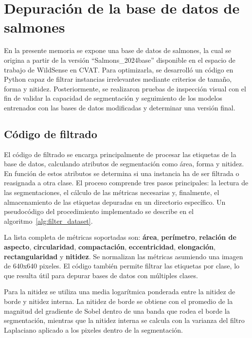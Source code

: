 \section{Depuración de la base de datos de salmones}
En la presente memoria se expone una base de datos de salmones, la cual se origina a partir de la versión ``Salmons\_2024base'' disponible en el espacio de trabajo de WildSense en CVAT. Para optimizarla, se desarrolló un código en Python capaz de filtrar instancias irrelevantes mediante criterios de tamaño, forma y nitidez. Posteriormente, se realizaron pruebas de inspección visual con el fin de validar la capacidad de segmentación y seguimiento de los modelos entrenados con las bases de datos modificadas y determinar una versión final.

\subsection{Código de filtrado}
El código de filtrado se encarga principalmente de procesar las etiquetas de la base de datos, calculando atributos de segmentación como área, forma y nitidez. En función de estos atributos se determina si una instancia ha de ser filtrada o reasignada a otra clase. El proceso comprende tres pasos principales: la lectura de las segmentaciones, el cálculo de las métricas necesarias y, finalmente, el almacenamiento de las etiquetas depuradas en un directorio específico. Un pseudocódigo del procedimiento implementado se describe en el algoritmo~\ref{alg:filter_dataset}.

La lista completa de métricas soportadas son: \textbf{área}, \textbf{perímetro}, \textbf{relación de aspecto}, \textbf{circularidad}, \textbf{compactación}, \textbf{eccentricidad}, \textbf{elongación}, \textbf{rectangularidad} y \textbf{nitidez}. Se normalizan las métricas asumiendo una imagen de 640x640 pixeles. El código también permite filtrar las etiquetas por clase, lo que resulta útil para depurar bases de datos con múltiples clases.

Para la nitidez se utiliza una media logarítmica ponderada entre la nitidez de borde y nitidez interna. La nitidez de borde se obtiene con el promedio de la magnitud del gradiente de Sobel dentro de una banda que rodea el borde la segmentación, mientras que la nitidez interna se calcula con la varianza del filtro Laplaciano aplicado a los pixeles dentro de la segmentación.

